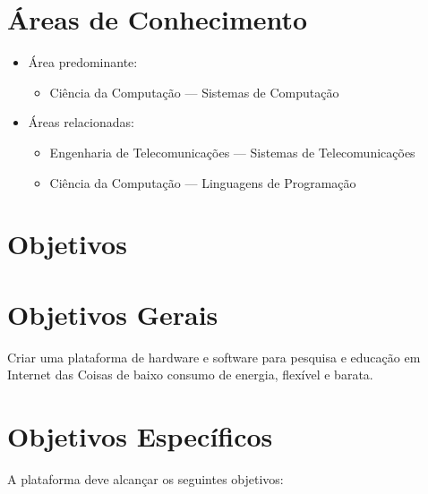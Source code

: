 \documentclass[titlepage,12pt]{article}
\begin{document}

\section{Áreas de Conhecimento}

\begin{itemize}
\item Área predominante:
    \begin{itemize}
    \item Ciência da Computação --- Sistemas de Computação     
    \end{itemize}
\item Áreas relacionadas:
    \begin{itemize}
    \item Engenharia de Telecomunicações --- Sistemas de Telecomunicações
    \item Ciência da Computação --- Linguagens de Programação
    \end{itemize}
\end{itemize}


\section{ Objetivos }

\section{ Objetivos Gerais }

Criar uma plataforma de hardware e software para pesquisa e educação em
Internet das Coisas de baixo consumo de energia, flexível e barata.

\section{ Objetivos Específicos }

A plataforma deve alcançar os seguintes objetivos:
\end{document}

